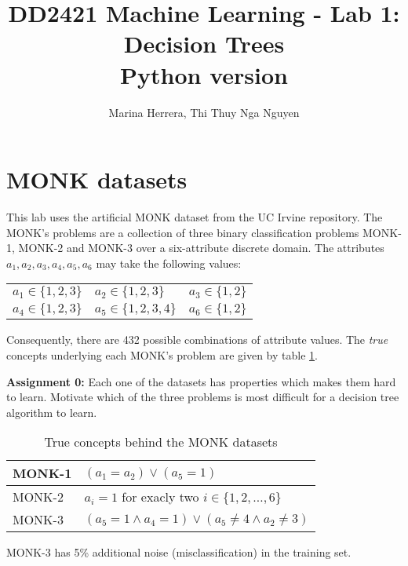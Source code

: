 \documentclass[11pt]{article}
\title{\vspace{-5.0cm}DD2421 Machine Learning - Lab 1: Decision Trees \\ Python version}
\author{Marina Herrera, Thi Thuy Nga Nguyen }
\date{}
\begin{document}
\maketitle


\section{MONK datasets}

This lab uses the artificial MONK dataset from the UC Irvine repository.
The MONK's problems are a collection of three binary classification
problems MONK-1, MONK-2 and MONK-3 over a six-attribute discrete domain.
The attributes \(a_1, a_2, a_3, a_4, a_5, a_6\) may take the following values:

\begin{center}
  \begin{tabular}{lll}
    \(a_1 \in \{1, 2, 3\}\) &
    \(a_2 \in \{1, 2, 3\}\) &
    \(a_3 \in \{1, 2\}\)\\
    \(a_4 \in \{1, 2, 3\}\) &
    \(a_5 \in \{1, 2, 3, 4\}\) &
    \(a_6 \in \{1, 2\}\)\\
  \end{tabular}
\end{center}
Consequently, there are 432 possible combinations of attribute values. 
The \emph{true} concepts underlying each MONK's problem are given by
table \ref{tab:truemonk}.

\begin{tcolorbox}
\textbf{Assignment 0:}
Each one of the datasets has properties which makes them hard to learn.
Motivate which of the three problems is most difficult for a decision
tree algorithm to learn.
\end{tcolorbox}

\begin{table}
  \caption{True concepts behind the MONK datasets \label{tab:truemonk}}
  \begin{center}
    \begin{tabular}{|l|l|}
      \hline
      MONK-1 & \((a_1=a_2)\vee(a_5=1)\)\\
      \hline
      MONK-2 & \(a_i=1\) for exacly two \(i \in \{1, 2, \ldots, 6\}\)\\
      \hline
      MONK-3 & \((a_5=1 \wedge a_4=1) \vee (a_5\ne 4 \wedge a_2\ne 3)\)\\
      \hline
    \end{tabular}
  \end{center}
  MONK-3 has 5\% additional noise (misclassification) in the training set.
\end{table}
\end{document}

